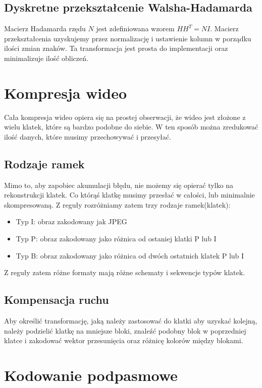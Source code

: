 \documentclass{../notatki}
\begin{document}
\subsection{Dyskretne przekształcenie Walsha-Hadamarda}

Macierz Hadamarda rzędu $N$ jest zdefiniowana wzorem $HH^T = NI$. Macierz
przekształcenia uzyskujemy przez normalizację i ustawienie kolumn w porządku
ilości zmian znaków. Ta transformacja jest prosta do implementacji oraz
minimalizuje ilość obliczeń.

\section{Kompresja wideo}

Cała kompresja wideo opiera się na prostej obserwacji, że wideo jest
złożone z wielu klatek, które są bardzo podobne do siebie. W ten sposób
można zredukować ilość danych, które musimy przechowywać i przesyłać.

\subsection{Rodzaje ramek}

Mimo to, aby zapobiec akumulacji błędu, nie możemy się opierać tylko na
rekonstrukcji klatek. Co którąś klatkę musimy przesłać w całości, lub
minimalnie skompresowaną. Z reguły rozróżniamy zatem trzy rodzaje ramek(klatek):
\begin{itemize}
  \item Typ I: obraz zakodowany jak JPEG
  \item Typ P: obraz zakodowany jako różnica od ostaniej klatki P lub I
  \item Typ B: obraz zakodowany jako różnica od dwóch ostatnich klatek P lub I
\end{itemize}
Z reguły zatem różne formaty mają różne schematy i sekwencje typów klatek.

\subsection{Kompensacja ruchu}

Aby określić transformację, jaką należy zastosować do klatki aby
uzyskać kolejną,
należy podzielić klatkę na mniejsze bloki, znaleźć podobny blok w poprzedniej
klatce i zakodować wektor przesunięcia oraz różnicę kolorów między blokami.

\section{Kodowanie podpasmowe}
\end{document}
